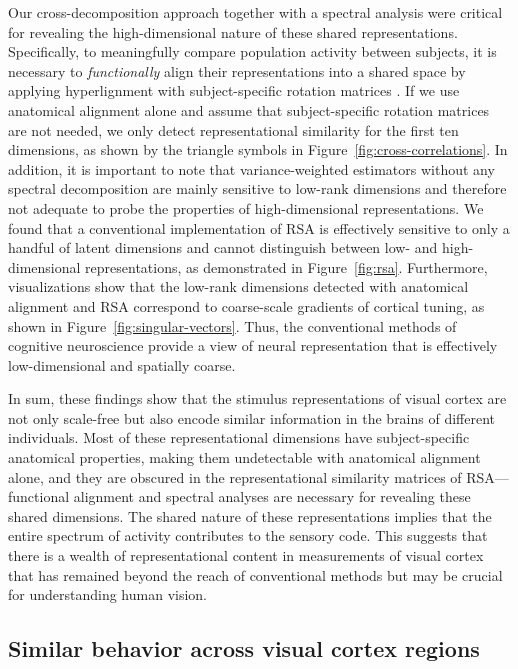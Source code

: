 \documentclass[10pt]{article}
\begin{document}
Our cross-decomposition approach together with a spectral analysis were critical for revealing the high-dimensional nature of these shared representations. Specifically, to meaningfully compare population activity between subjects, it is necessary to \emph{functionally} align their representations into a shared space by applying hyperlignment with subject-specific rotation matrices \autocite{Haxby2011}. If we use anatomical alignment alone and assume that subject-specific rotation matrices are not needed, we only detect representational similarity for the first ten dimensions, as shown by the triangle symbols in Figure~\ref{fig:cross-correlations}. In addition, it is important to note that variance-weighted estimators without any spectral decomposition are mainly sensitive to low-rank dimensions and therefore not adequate to probe the properties of high-dimensional representations. We found that a conventional implementation of RSA is effectively sensitive to only a handful of latent dimensions and cannot distinguish between low- and high-dimensional representations, as demonstrated in Figure~\ref{fig:rsa}. Furthermore, visualizations show that the low-rank dimensions detected with anatomical alignment and RSA correspond to coarse-scale gradients of cortical tuning, as shown in Figure~\ref{fig:singular-vectors}. Thus, the conventional methods of cognitive neuroscience provide a view of neural representation that is effectively low-dimensional and spatially coarse.

In sum, these findings show that the stimulus representations of visual cortex are not only scale-free but also encode similar information in the brains of different individuals. Most of these representational dimensions have subject-specific anatomical properties, making them undetectable with anatomical alignment alone, and they are obscured in the representational similarity matrices of RSA---functional alignment and spectral analyses are necessary for revealing these shared dimensions. The shared nature of these representations implies that the entire spectrum of activity contributes to the sensory code. This suggests that there is a wealth of representational content in measurements of visual cortex that has remained beyond the reach of conventional methods but may be crucial for understanding human vision.

\subsection{Similar behavior across visual cortex regions}\label{similar-behavior-across-visual-cortex-regions}
\end{document}
